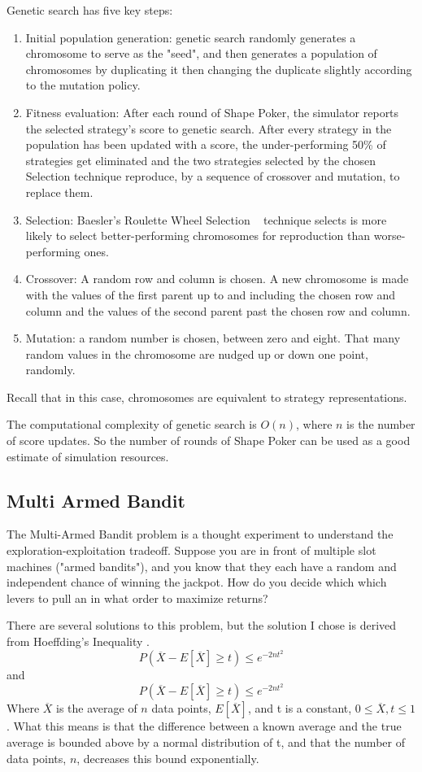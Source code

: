 \documentclass[11pt]{article}
\begin{document}
Genetic search has five key steps:
\begin{enumerate}
    \item Initial population generation: genetic search randomly generates a chromosome to serve as the "seed", and then generates a population of chromosomes by duplicating it then changing the duplicate slightly according to the mutation policy. 
    \item Fitness evaluation: After each round of Shape Poker, the simulator reports the selected strategy's score to genetic search. After every strategy in the population has been updated with a score, the under-performing 50\% of strategies get eliminated and the two strategies selected by the chosen Selection technique reproduce, by a sequence of crossover and mutation, to replace them. 
    \item Selection: Baesler's Roulette Wheel Selection ~\cite{Baes-Sepu-2000} technique selects is more likely to select better-performing chromosomes for reproduction than worse-performing ones.
    \item Crossover: A random row and column is chosen. A new chromosome is made with the values of the first parent up to and including the chosen row and column and the values of the second parent past the chosen row and column.
    \item Mutation: a random number is chosen, between zero and eight. That many random values in the chromosome are nudged up or down one point, randomly.
\end{enumerate}
Recall that in this case, chromosomes are equivalent to strategy representations.

The computational complexity of genetic search is $O(n)$, where $n$ is the number of score updates. So the number of rounds of Shape Poker can be used as a good estimate of simulation resources.

\subsection{Multi Armed Bandit}
The Multi-Armed Bandit problem is a thought experiment to understand the exploration-exploitation tradeoff. Suppose you are in front of multiple slot machines ("armed bandits"), and you know that they each have a random and independent chance of winning the jackpot. How do you decide which which levers to pull an in what order to maximize returns?

There are several solutions to this problem, but the solution I chose is derived from Hoeffding's Inequality \cite{Hoef-1994}.
$$
P(\overline{X}-E[\overline{X}] \geq t) \leq e^{-2nt^{2}}
$$ and
$$
P(\overline{X}-E[\overline{X}] \geq t) \leq e^{-2nt^{2}}
$$
Where $\overline{X}$ is the average of $n$ data points, $E[\overline{X}]$, and t is a constant, $0 \leq \overline{X}, t \leq 1$. What this means is that the difference between a known average and the true average is bounded above by a normal distribution of t, and that the number of data points, $n$, decreases this bound exponentially.
\end{document}
